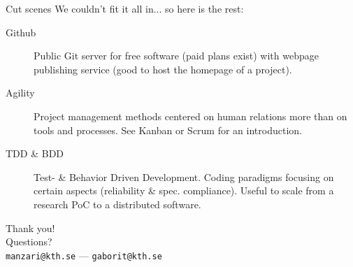 \documentclass[10pt]{beamer}
\begin{document}
\begin{frame}{Cut scenes}
		We couldn't fit it all in... so here is the rest:

		\begin{description}
			\item[Github] Public Git server for free software (paid plans exist)
				with webpage publishing service (good to host the homepage of a project).
			\item[Agility] Project management methods centered on human relations more than on
				tools and processes. See Kanban or Scrum for an introduction.
			\item[TDD \& BDD] Test- \& Behavior Driven Development. Coding paradigms focusing
				on certain aspects (reliability \& spec. compliance). Useful to scale from a
				research PoC to a distributed software.
		\end{description}
\end{frame}


\begin{frame}[standout] %
	Thank you!\\
	\vspace{0.05\textwidth}
	Questions?\\
	\vspace{0.25\textwidth}
	\scriptsize{\texttt{manzari@kth.se}} --- \scriptsize{\texttt{gaborit@kth.se}}\\
\end{frame}

\end{document}
